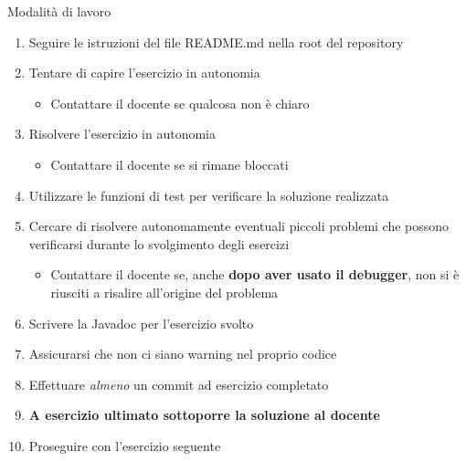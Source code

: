\documentclass[presentation]{beamer}
\begin{document}
\begin{frame}{Modalità di lavoro}
	\begin{enumerate}
		\item Seguire le istruzioni del file README.md nella root del repository
		\item Tentare di capire l'esercizio in autonomia
		\begin{itemize}
			\item Contattare il docente se qualcosa non è chiaro
		\end{itemize}
		\item Risolvere l'esercizio in autonomia
		\begin{itemize}
			\item Contattare il docente se si rimane bloccati
		\end{itemize}
		\item Utilizzare le funzioni di test per verificare la soluzione realizzata
		\item Cercare di risolvere autonomamente eventuali piccoli problemi che possono verificarsi durante lo svolgimento degli esercizi
		\begin{itemize}
			\item Contattare il docente se, anche \textbf{dopo aver usato il debugger}, non si è riusciti a risalire all'origine del problema
		\end{itemize}
		\item Scrivere la Javadoc per l'esercizio svolto
		\item Assicurarsi che non ci siano warning nel proprio codice
		\item Effettuare \textit{almeno} un commit ad esercizio completato
		\item \textbf{A esercizio ultimato sottoporre la soluzione al docente}
		\item Proseguire con l'esercizio seguente
	\end{enumerate}
\end{frame}
\end{document}
